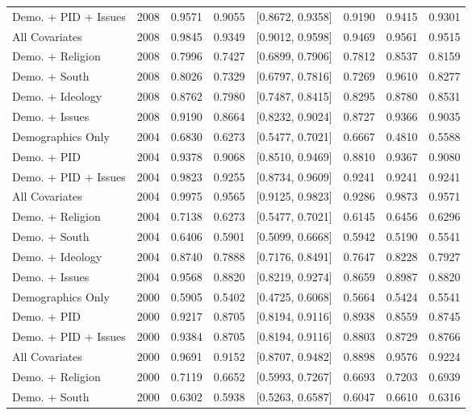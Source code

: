 \begin{longtable}{lrrrlrrr}
  Demo. + PID + Issues & 2008 & 0.9571 & 0.9055 & [0.8672, 0.9358] & 0.9190 & 0.9415 & 0.9301 \\ 
  All Covariates & 2008 & 0.9845 & 0.9349 & [0.9012, 0.9598] & 0.9469 & 0.9561 & 0.9515 \\ 
  Demo. + Religion & 2008 & 0.7996 & 0.7427 & [0.6899, 0.7906] & 0.7812 & 0.8537 & 0.8159 \\ 
  Demo. + South & 2008 & 0.8026 & 0.7329 & [0.6797, 0.7816] & 0.7269 & 0.9610 & 0.8277 \\ 
  Demo. + Ideology & 2008 & 0.8762 & 0.7980 & [0.7487, 0.8415] & 0.8295 & 0.8780 & 0.8531 \\ 
  Demo. + Issues & 2008 & 0.9190 & 0.8664 & [0.8232, 0.9024] & 0.8727 & 0.9366 & 0.9035 \\ 
  Demographics Only & 2004 & 0.6830 & 0.6273 & [0.5477, 0.7021] & 0.6667 & 0.4810 & 0.5588 \\ 
  Demo. + PID & 2004 & 0.9378 & 0.9068 & [0.8510, 0.9469] & 0.8810 & 0.9367 & 0.9080 \\ 
  Demo. + PID + Issues & 2004 & 0.9823 & 0.9255 & [0.8734, 0.9609] & 0.9241 & 0.9241 & 0.9241 \\ 
  All Covariates & 2004 & 0.9975 & 0.9565 & [0.9125, 0.9823] & 0.9286 & 0.9873 & 0.9571 \\ 
  Demo. + Religion & 2004 & 0.7138 & 0.6273 & [0.5477, 0.7021] & 0.6145 & 0.6456 & 0.6296 \\ 
  Demo. + South & 2004 & 0.6406 & 0.5901 & [0.5099, 0.6668] & 0.5942 & 0.5190 & 0.5541 \\ 
  Demo. + Ideology & 2004 & 0.8740 & 0.7888 & [0.7176, 0.8491] & 0.7647 & 0.8228 & 0.7927 \\ 
  Demo. + Issues & 2004 & 0.9568 & 0.8820 & [0.8219, 0.9274] & 0.8659 & 0.8987 & 0.8820 \\ 
  Demographics Only & 2000 & 0.5905 & 0.5402 & [0.4725, 0.6068] & 0.5664 & 0.5424 & 0.5541 \\ 
  Demo. + PID & 2000 & 0.9217 & 0.8705 & [0.8194, 0.9116] & 0.8938 & 0.8559 & 0.8745 \\ 
  Demo. + PID + Issues & 2000 & 0.9384 & 0.8705 & [0.8194, 0.9116] & 0.8803 & 0.8729 & 0.8766 \\ 
  All Covariates & 2000 & 0.9691 & 0.9152 & [0.8707, 0.9482] & 0.8898 & 0.9576 & 0.9224 \\ 
  Demo. + Religion & 2000 & 0.7119 & 0.6652 & [0.5993, 0.7267] & 0.6693 & 0.7203 & 0.6939 \\ 
  Demo. + South & 2000 & 0.6302 & 0.5938 & [0.5263, 0.6587] & 0.6047 & 0.6610 & 0.6316 \\ 

\end{longtable}
